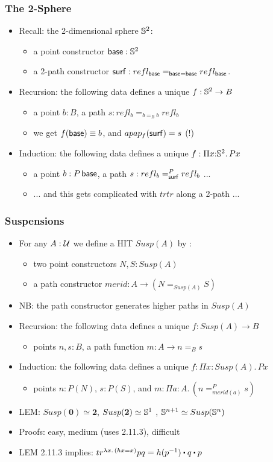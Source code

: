 \documentclass[handout]{beamer}
\newcommand{\depi}[3]{\Pi{#1{:}#2.\,#3}}
\newcommand{\lam}[2]{\lambda{#1.\,#2}}
\newcommand{\UU}{{\cal U}}
\newcommand{\bfnull}{\mathbf{0}}
\newcommand{\bftwo}{\mathbf{2}}
\newcommand{\ct}{%
  \mathchoice{\mathbin{\raisebox{0.5ex}{$\displaystyle\centerdot$}}}%
             {\mathbin{\raisebox{0.5ex}{$\centerdot$}}}%
             {\mathbin{\raisebox{0.25ex}{$\scriptstyle\,\centerdot\,$}}}%
             {\mathbin{\raisebox{0.1ex}{$\scriptscriptstyle\,\centerdot\,$}}}
}
\begin{document}
\frame
  {
    \frametitle{The 2-Sphere}
    
\begin{itemize}    
    \item Recall: the 2-dimensional sphere $\mathbb{S}^2$:
\begin{itemize}
\item a point constructor $\mathsf{base} :\mathbb{S}^2$
\item a 2-path constructor $\mathsf{surf} : refl_{\mathsf{base}} =_{\mathsf{base}=\mathsf{base}} refl_{\mathsf{base}}$.
\end{itemize}
    \item Recursion: the following data defines a unique $f:\mathbb{S}^2 \to B$
\begin{itemize}
\item a point $b :B$, a path $s : refl_b=_{b=_B b} refl_b$
\item we get $f(\mathsf{base}) \equiv b$, and $apap_f(\mathsf{surf}) = s$ (!)
\end{itemize}
    \item Induction: the following data defines a unique $f:\depi{x}{\Sn^2}{Px}$
\begin{itemize}
\item a point $b :P\,\mathsf{base}$, a path $s : refl_b=^P_{\mathsf{surf}} refl_b$ ...
\item ... and this gets complicated with $trtr$ along a 2-path ...
\end{itemize}
   
 \end{itemize}
  }
 
 
   \frame
  {
    \frametitle{Suspensions}
    
\begin{itemize}    
    \item For any $A:\UU$  we define a HIT $Susp(A)$ by :
\begin{itemize}
\item two point constructors $N,S: Susp(A)$
\item a path constructor $merid: A\to (N =_{Susp(A)} S)$
\end{itemize}
    \item NB: the path constructor generates higher paths in $Susp(A)$
    \item Recursion: the following data defines a unique $f:Susp(A) \to B$
\begin{itemize}
\item points $n,s :B$, a path function $m:  A\to n =_B s$
\end{itemize}
    \item Induction: the following data defines a unique $f:\depi{x}{Susp(A)}{Px}$
\begin{itemize}
\item points $n :P(N)$, $s :P(S)$, and $m: \depi{a}{A}{(n =^P_{merid(a)} s)}$
\end{itemize}
    \item LEM: $Susp(\bfnull) \simeq \bftwo$, $Susp(\bftwo) \simeq \Sn^1$ , $\mathbb{S}^{n+1}\simeq Susp(\mathbb{S}^n)$
    \item Proofs: easy, medium (uses 2.11.3), difficult
    \item LEM 2.11.3 implies: $tr^{\lam{x}{(hx = x)}}pq = h(p^{-1})\ct q \ct p$ 
 \end{itemize}
  }
  
\end{document}
